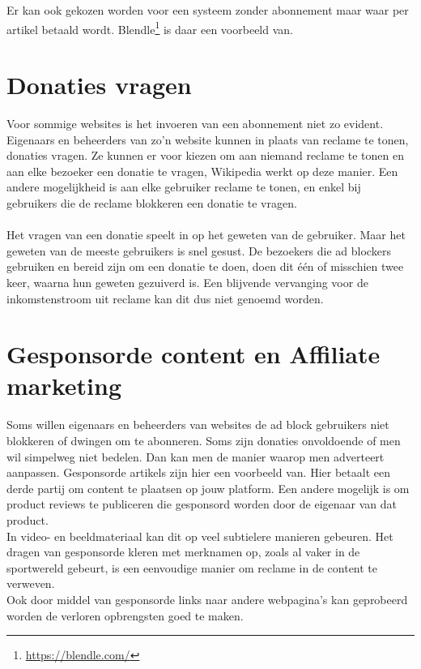 \documentclass[pdftex,a4paper,12pt,twoside]{report}
\begin{document}
Er kan ook gekozen worden voor een systeem zonder abonnement maar waar per artikel betaald wordt. Blendle\footnote{\url{https://blendle.com/}} is daar een voorbeeld van.

\section{Donaties vragen}
\label{sec Donaties vragen}
Voor sommige websites is het invoeren van een abonnement niet zo evident. Eigenaars en beheerders van zo'n website kunnen in plaats van reclame te tonen, donaties vragen. Ze kunnen er voor kiezen om aan niemand reclame te tonen en aan elke bezoeker een donatie te vragen, Wikipedia werkt op deze manier. Een andere mogelijkheid is aan elke gebruiker reclame te tonen, en enkel bij gebruikers die de reclame blokkeren een donatie te vragen.
\\
\\
Het vragen van een donatie speelt in op het geweten van de gebruiker. Maar het geweten van de meeste gebruikers is snel gesust. De bezoekers die ad blockers gebruiken en bereid zijn om een donatie te doen, doen dit één of misschien twee keer, waarna hun geweten gezuiverd is. Een blijvende vervanging voor de inkomstenstroom uit reclame kan dit dus niet genoemd worden.


\section{Gesponsorde content en Affiliate marketing}
\label{sec Gesponsorde content en affiliate marketing}
Soms willen eigenaars en beheerders van websites de ad block gebruikers niet blokkeren of dwingen om te abonneren. Soms zijn donaties onvoldoende of men wil simpelweg niet bedelen. Dan kan men de manier waarop men adverteert aanpassen. Gesponsorde artikels zijn hier een voorbeeld van. Hier betaalt een derde partij om content te plaatsen op jouw platform. Een andere mogelijk is om product reviews te publiceren die gesponsord worden door de eigenaar van dat product. 
\\
In video- en beeldmateriaal kan dit op veel subtielere manieren gebeuren. Het dragen van gesponsorde kleren met merknamen op, zoals al vaker in de sportwereld gebeurt, is een eenvoudige manier om reclame in de content te verweven.
\\
Ook door middel van gesponsorde links naar andere webpagina's kan geprobeerd worden de verloren opbrengsten goed te maken.
\end{document}

